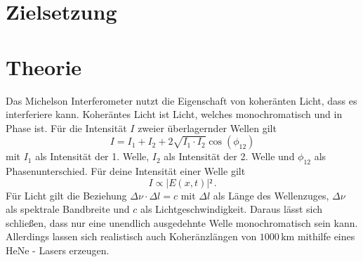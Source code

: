 \section{Zielsetzung}
\label{sec:Zielsetzung}

\section{Theorie}
\label{sec:Theorie}
Das Michelson Interferometer nutzt die Eigenschaft von koheränten Licht, dass es interferiere kann. Koheräntes Licht ist Licht, welches monochromatisch 
und in Phase ist. Für die Intensität $I$ zweier überlagernder Wellen gilt 
\begin{equation}
I = I_1 + I_2 + 2 \sqrt{I_1 \cdot I_2} \cos(\phi_{12})  
\end{equation}
mit $I_1$ als Intensität der 1. Welle, $I_2$ als Intensität der 2. Welle und $\phi_{12}$ als Phasenunterschied. Für deine Intensität einer Welle gilt 
\begin{equation}
    I \propto |E(x,t)|² \, .
\end{equation}
Für Licht gilt die Beziehung $\Delta \nu \cdot \Delta l = c$ mit $\Delta l$ als Länge des Wellenzuges, $\Delta \nu$ als spektrale Bandbreite und $c$ als 
Lichtgeschwindigkeit. Daraus lässt sich schließen, dass nur eine unendlich ausgedehnte Welle monochromatisch sein kann. 
Allerdings lassen sich realistisch auch Koheränzlängen von $1000 \, \unit{\kilo\meter}$ mithilfe eines HeNe - Lasers erzeugen. 
